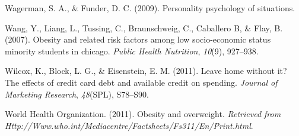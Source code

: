 \documentclass[man]{apa6}
\begin{document}
\leavevmode\hypertarget{ref-wagerman2009personality}{}%
Wagerman, S. A., \& Funder, D. C. (2009). Personality psychology of situations.

\leavevmode\hypertarget{ref-wang2007}{}%
Wang, Y., Liang, L., Tussing, C., Braunschweig, C., Caballero B, \& Flay, B. (2007). Obesity and related risk factors among low socio-economic status minority students in chicago. \emph{Public Health Nutrition}, \emph{10}(9), 927--938.

\leavevmode\hypertarget{ref-wilcox2011leave}{}%
Wilcox, K., Block, L. G., \& Eisenstein, E. M. (2011). Leave home without it? The effects of credit card debt and available credit on spending. \emph{Journal of Marketing Research}, \emph{48}(SPL), S78--S90.

\leavevmode\hypertarget{ref-who2011}{}%
World Health Organization. (2011). Obesity and overweight. \emph{Retrieved from Http://Www.who.int/Mediacentre/Factsheets/Fs311/En/Print.html}.

\endgroup
\end{document}
